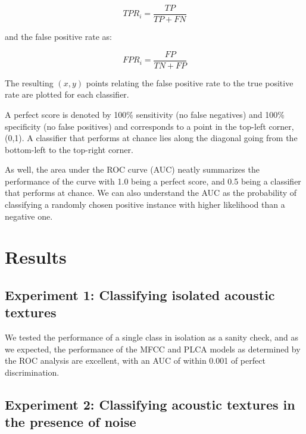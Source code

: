 \begin{equation}
TPR_i = \frac{TP}{TP + FN}
\end{equation}

and the false positive rate as: 

\begin{equation}
FPR_i = \frac{FP}{TN + FP}
\end{equation}

The resulting $(x,y)$ points relating the false positive rate to the true positive rate are plotted for each classifier.

A perfect score is denoted by 100\% sensitivity (no false negatives) and 100\% specificity (no false positives) and corresponds to a point in the top-left corner, (0,1).  A classifier that performs at chance lies along the diagonal going from the bottom-left to the top-right corner.  

As well, the area under the ROC curve (AUC) neatly summarizes the performance of the curve with 1.0 being a perfect score, and 0.5 being a classifier that performs at chance.  We can also understand the AUC as the probability of classifying a randomly chosen positive instance with higher likelihood than a negative one.

\section{Results}

\subsection*{Experiment 1: Classifying isolated acoustic textures}

We tested the performance of a single class in isolation as a sanity check, and as we expected, the performance of the MFCC and PLCA models as determined by the ROC analysis are excellent, with an AUC of within 0.001 of perfect discrimination.




\subsection*{Experiment 2: Classifying acoustic textures in the presence of noise}

